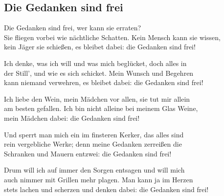 
\subsection*{Die Gedanken sind frei}
%

\thestrophe Die Gedanken sind frei, wer kann sie erraten? \\
Sie fliegen vorbei wie nächtliche Schatten. Kein Mensch kann sie wissen, \\
kein Jäger sie schießen, es bleibet dabei: die Gedanken sind frei!

\thestrophe Ich denke, was ich will und was mich beglücket, doch alles in \\
der Still', und wie es sich schicket. Mein Wunsch und Begehren \\
kann niemand verwehren, es bleibet dabei: die Gedanken sind frei!

\thestrophe Ich liebe den Wein, mein Mädchen vor allen, sie tut mir allein \\
am besten gefallen. Ich bin nicht alleine bei meinem Glas Weine, \\
mein Mädchen dabei: die Gedanken sind frei!

\thestrophe Und sperrt man mich ein im finsteren Kerker, das alles sind \\
rein vergebliche Werke; denn meine Gedanken zerreißen die \\
Schranken und Mauern entzwei: die Gedanken sind frei!

\thestrophe Drum will ich auf immer den Sorgen entsagen und will mich \\
auch nimmer mit Grillen mehr plagen. Man kann ja im Herzen \\
stets lachen und scherzen und denken dabei: die Gedanken sind frei!